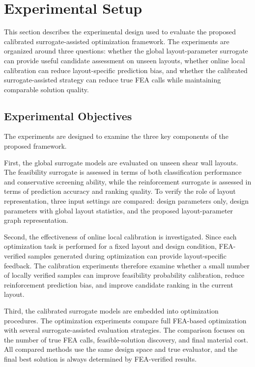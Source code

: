 

\section{Experimental Setup}
\label{sec:experimental_setup}

This section describes the experimental design used to evaluate the proposed calibrated surrogate-assisted optimization framework. The experiments are organized around three questions: whether the global layout-parameter surrogate can provide useful candidate assessment on unseen layouts, whether online local calibration can reduce layout-specific prediction bias, and whether the calibrated surrogate-assisted strategy can reduce true FEA calls while maintaining comparable solution quality.

\subsection{Experimental Objectives}
\label{subsec:experimental_objectives}

The experiments are designed to examine the three key components of the proposed framework.

First, the global surrogate models are evaluated on unseen shear wall layouts. The feasibility surrogate is assessed in terms of both classification performance and conservative screening ability, while the reinforcement surrogate is assessed in terms of prediction accuracy and ranking quality. To verify the role of layout representation, three input settings are compared: design parameters only, design parameters with global layout statistics, and the proposed layout-parameter graph representation.

Second, the effectiveness of online local calibration is investigated. Since each optimization task is performed for a fixed layout and design condition, FEA-verified samples generated during optimization can provide layout-specific feedback. The calibration experiments therefore examine whether a small number of locally verified samples can improve feasibility probability calibration, reduce reinforcement prediction bias, and improve candidate ranking in the current layout.

Third, the calibrated surrogate models are embedded into optimization procedures. The optimization experiments compare full FEA-based optimization with several surrogate-assisted evaluation strategies. The comparison focuses on the number of true FEA calls, feasible-solution discovery, and final material cost. All compared methods use the same design space and true evaluator, and the final best solution is always determined by FEA-verified results.


